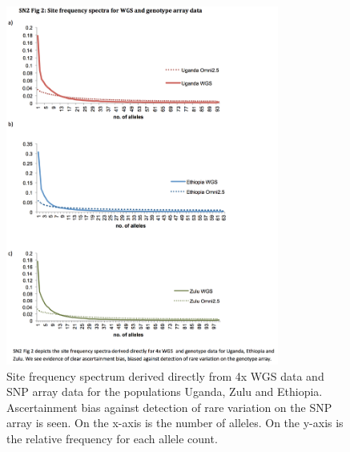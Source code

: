 \begin{figure}
\centering
\includegraphics[width=0.8\textwidth]{fig/SN02f2}
\caption[xxx]{Site frequency spectrum derived directly from 4x \gls{WGS} data and SNP array data for the populations Uganda, Zulu and Ethiopia. Ascertainment bias against detection of rare variation on the SNP array is seen. On the x-axis is the number of alleles. On the y-axis is the relative frequency for each allele count.}
\label{fig:SN02f2}
\end{figure}